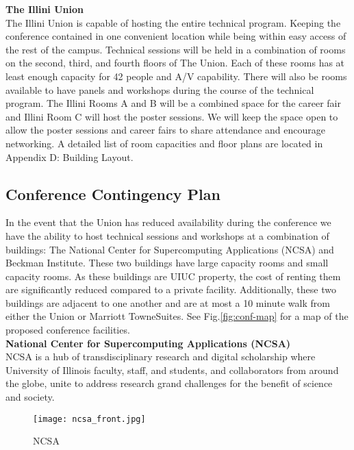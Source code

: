 \textbf{The Illini Union}\\





The Illini Union is capable of hosting the entire technical program. Keeping the conference contained in one convenient location while being within easy access of the rest of the campus. Technical sessions will be held in a combination of rooms on the second, third, and fourth floors of The Union. Each of these rooms has at least enough capacity for 42 people and A/V capability. There will also be rooms available to have panels and workshops during the course of the technical program. The Illini Rooms A and B will be a combined space for the career fair and Illini Room C will host the poster sessions. We will keep the space open to allow the poster sessions and career fairs to share attendance and encourage networking. A detailed list of room capacities and floor plans are located in Appendix D: Building Layout. 



\subsection{Conference Contingency Plan}
In the event that the Union has reduced availability during the conference we have the ability to host technical sessions and workshops at a combination of buildings: The National Center for Supercomputing Applications (NCSA) and Beckman Institute. These two buildings have large capacity rooms and small capacity rooms. As these buildings are UIUC property, the cost of renting them are significantly reduced compared to a private facility. Additionally, these two buildings are adjacent to one another and are at most a 10 minute walk from either the Union or Marriott TowneSuites. See Fig.\ref{fig:conf-map} for a map of the proposed conference facilities.\\


\textbf{National Center for Supercomputing Applications (NCSA)}\\
NCSA is a hub of transdisciplinary research and digital scholarship where University of Illinois faculty, staff, and students, and collaborators from around the globe, unite to address research grand challenges for the benefit of science and society.\\
\begin{figure}[H]
	\centering
	\texttt{[image: ncsa\_front.jpg]}
	\caption{NCSA}
	\label{fig:ncsa}
\end{figure}

